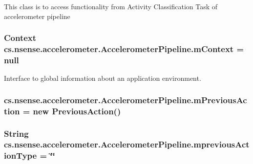 This class is to access functionality from Activity Classification Task of accelerometer pipeline \hypertarget{classcs_1_1nsense_1_1accelerometer_1_1_accelerometer_pipeline_ab0dc7e6a6e83519769a749dcc8bcd830}{
\subsubsection[{m\-Context}]{\setlength{\rightskip}{0pt plus 5cm}Context cs.\-nsense.\-accelerometer.\-Accelerometer\-Pipeline.\-m\-Context = null\hspace{0.3cm}{\ttfamily [private]}}}\label{classcs_1_1nsense_1_1accelerometer_1_1_accelerometer_pipeline_ab0dc7e6a6e83519769a749dcc8bcd830}
Interface to global information about an application environment. \hypertarget{classcs_1_1nsense_1_1accelerometer_1_1_accelerometer_pipeline_a0b89c3190d00649a5ce72997490db7f5}{
\subsubsection[{m\-Previous\-Action}]{ cs.\-nsense.\-accelerometer.\-Accelerometer\-Pipeline.\-m\-Previous\-Action = new {\bf Previous\-Action}()\hspace{0.3cm}{\ttfamily [private]}}}\label{classcs_1_1nsense_1_1accelerometer_1_1_accelerometer_pipeline_a0b89c3190d00649a5ce72997490db7f5}
\hypertarget{classcs_1_1nsense_1_1accelerometer_1_1_accelerometer_pipeline_ab6e833e25be760387c8431d3a62cc392}{
\subsubsection[{mprevious\-Action\-Type}]{\setlength{\rightskip}{0pt plus 5cm}String cs.\-nsense.\-accelerometer.\-Accelerometer\-Pipeline.\-mprevious\-Action\-Type = \char`\"{}\char`\"{}\hspace{0.3cm}{\ttfamily [static]}}}\label{classcs_1_1nsense_1_1accelerometer_1_1_accelerometer_pipeline_ab6e833e25be760387c8431d3a62cc392}
